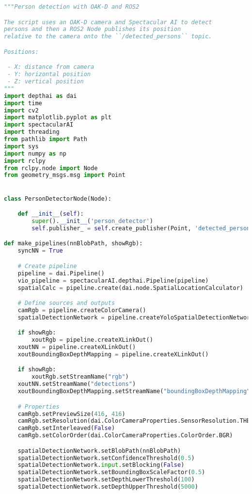 \begin{lstlisting}[language=python,frame=single]
"""Person detection with OAK-D and ROS2

The script uses an OAK-D camera and Spectacular AI to detect
persons and then a ROS2 Node publishes its position
relative to the camera onto the ``/detected_persons`` topic.

Positions:

 - X: distance from camera
 - Y: horizontal position
 - Z: vertical position
"""
import depthai as dai
import time
import cv2
import matplotlib.pyplot as plt
import spectacularAI
import threading
from pathlib import Path
import sys
import numpy as np
import rclpy
from rclpy.node import Node
from geometry_msgs.msg import Point


class PersonDetectorNode(Node):

    def __init__(self):
        super().__init__('person_detector')
        self.publisher_ = self.create_publisher(Point, 'detected_persons', 10)

def make_pipelines(nnBlobPath, showRgb):
    syncNN = True

    # Create pipeline
    pipeline = dai.Pipeline()
    vio_pipeline = spectacularAI.depthai.Pipeline(pipeline)
    spatialCalc = pipeline.create(dai.node.SpatialLocationCalculator)

    # Define sources and outputs
    camRgb = pipeline.createColorCamera()
    spatialDetectionNetwork = pipeline.createYoloSpatialDetectionNetwork()

    if showRgb:
        xoutRgb = pipeline.createXLinkOut()
    xoutNN = pipeline.createXLinkOut()
    xoutBoundingBoxDepthMapping = pipeline.createXLinkOut()

    if showRgb:
        xoutRgb.setStreamName("rgb")
    xoutNN.setStreamName("detections")
    xoutBoundingBoxDepthMapping.setStreamName("boundingBoxDepthMapping")

    # Properties
    camRgb.setPreviewSize(416, 416)
    camRgb.setResolution(dai.ColorCameraProperties.SensorResolution.THE_1080_P)
    camRgb.setInterleaved(False)
    camRgb.setColorOrder(dai.ColorCameraProperties.ColorOrder.BGR)

    spatialDetectionNetwork.setBlobPath(nnBlobPath)
    spatialDetectionNetwork.setConfidenceThreshold(0.5)
    spatialDetectionNetwork.input.setBlocking(False)
    spatialDetectionNetwork.setBoundingBoxScaleFactor(0.5)
    spatialDetectionNetwork.setDepthLowerThreshold(100)
    spatialDetectionNetwork.setDepthUpperThreshold(5000)


\end{lstlisting}
